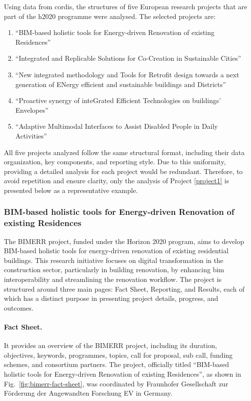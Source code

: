 Using data from \gls{cordis}, the structures of five European research projects that are part of the \gls{h2020} programme were analysed.
The selected projects are:
\begin{enumerate}
    \item ``BIM-based holistic tools for Energy-driven Renovation of existing Residences''\label{project1}
    \item ``Integrated and Replicable Solutions for Co-Creation in Sustainable Cities''
    \item ``New integrated methodology and Tools for Retrofit design towards a next generation of ENergy efficient and sustainable buildings and Districts''
    \item ``Proactive synergy of inteGrated Efficient Technologies on buildings' Envelopes''
    \item ``Adaptive Multimodal Interfaces to Assist Disabled People in Daily Activities'' 
\end{enumerate}

All five projects analyzed follow the same structural format, including their data organization, key components, and reporting style.
Due to this uniformity, providing a detailed analysis for each project would be redundant.
Therefore, to avoid repetition and ensure clarity, only the analysis of Project \ref{project1} is presented below as a representative example.

\subsubsection*{BIM-based holistic tools for Energy-driven Renovation of existing Residences}

The BIMERR project, funded under the Horizon 2020 program, aims to develop BIM-based holistic tools for energy-driven renovation of existing residential buildings.
This research initiative focuses on digital transformation in the construction sector, particularly in building renovation, by enhancing \gls{bim} interoperability and streamlining the renovation workflow.
The project is structured around three main pages: Fact Sheet, Reporting, and Results, each of which has a distinct purpose in presenting project details, progress, and outcomes.

\paragraph*{Fact Sheet.}
It provides an overview of the BIMERR project, including its duration, objectives, keywords, programmes, topics, call for proposal, sub call, funding schemes, and consortium partners.
The project, officially titled ``BIM-based holistic tools for Energy-driven Renovation of existing Residences'', as shown in Fig.~\ref{fig:bimerr-fact-sheet}, was coordinated by Fraunhofer Gesellschaft zur F\"orderung der Angewandten Forschung EV in Germany.

